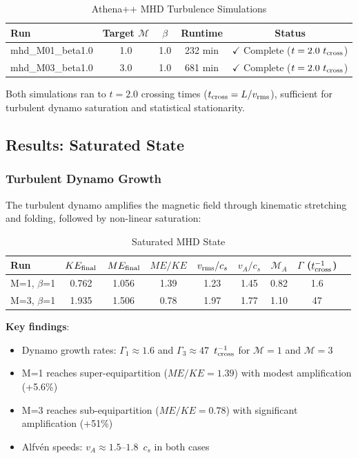\documentclass[11pt,a4paper]{article}
\begin{document}
\begin{table}[H]
\centering
\caption{Athena++ MHD Turbulence Simulations}
\begin{tabular}{lcccc}
\toprule
Run & Target $\mathcal{M}$ & $\beta$ & Runtime & Status \\
\midrule
mhd\_M01\_beta1.0 & 1.0 & 1.0 & 232 min & $\checkmark$ Complete ($t = 2.0~t_{\rm cross}$) \\
mhd\_M03\_beta1.0 & 3.0 & 1.0 & 681 min & $\checkmark$ Complete ($t = 2.0~t_{\rm cross}$) \\
\bottomrule
\end{tabular}
\end{table}

Both simulations ran to $t = 2.0$ crossing times ($t_{\rm cross} = L/v_{\rm rms}$), sufficient for turbulent dynamo saturation and statistical stationarity.

\subsection{Results: Saturated State}

\subsubsection{Turbulent Dynamo Growth}

The turbulent dynamo amplifies the magnetic field through kinematic stretching and folding, followed by non-linear saturation:

\begin{table}[H]
\centering
\caption{Saturated MHD State}
\begin{tabular}{lcccccccc}
\toprule
Run & $KE_{\rm final}$ & $ME_{\rm final}$ & $ME/KE$ & $v_{\rm rms}/c_s$ & $v_A/c_s$ & $\mathcal{M}_A$ & $\Gamma$ ($t_{\rm cross}^{-1}$) \\
\midrule
M=1, $\beta$=1 & 0.762 & 1.056 & 1.39 & 1.23 & 1.45 & 0.82 & 1.6 \\
M=3, $\beta$=1 & 1.935 & 1.506 & 0.78 & 1.97 & 1.77 & 1.10 & 47 \\
\bottomrule
\end{tabular}
\end{table}

\textbf{Key findings}:
\begin{itemize}
    \item Dynamo growth rates: $\Gamma_1 \approx 1.6$ and $\Gamma_3 \approx 47$~$t_{\rm cross}^{-1}$ for $\mathcal{M}=1$ and $\mathcal{M}=3$
    \item M=1 reaches super-equipartition ($ME/KE = 1.39$) with modest amplification (+5.6\%)
    \item M=3 reaches sub-equipartition ($ME/KE = 0.78$) with significant amplification (+51\%)
    \item Alfv\'en speeds: $v_A \approx 1.5$--$1.8$~$c_s$ in both cases
\end{itemize}
\end{document}
